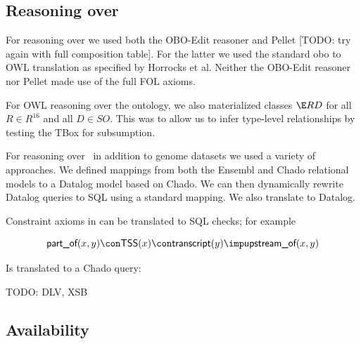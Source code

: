 \documentclass{article}
\def\upstreamOf{\pr{upstream\_of}}
\def\partOf{\pr{part\_of}}
\def\SOGI{\pr{SO$^{+}$}}
\def\transcript{\pr{transcript}}
\def\TSS{\pr{TSS}}
\begin{document}
\subsection{Reasoning over \SOGI}

For reasoning over \SOGI we used both the OBO-Edit reasoner and Pellet
[TODO: try again with full composition table]. For the latter we used
the standard obo to OWL translation as specified by Horrocks et
al. Neither the OBO-Edit reasoner nor Pellet made use of the full FOL
axioms.

For OWL reasoning over the ontology, we also materialized classes $\E
R D$ for all $R \in R^{16}$ and all $D \in SO$. This was to allow us
to infer type-level relationships by testing the TBox for subsumption.

For reasoning over \SOGI\ in addition to genome datasets we used a
variety of approaches. We defined mappings from both the Ensembl and
Chado relational models to a Datalog model based on Chado. We can then
dynamically rewrite Datalog queries to SQL using a standard
mapping\cite{Draxler1991}. We also translate \SOGI to Datalog.

Constraint axioms in \SOGI can be translated to SQL checks; for example

$$
\partOf(x,y) \con \TSS(x) \con \transcript(y) \imp \upstreamOf(x,y)
$$

Is translated to a Chado query:

\renewcommand{\ttdefault}{txtt}
\begin{scriptsize}
\lstset{linewidth=\textwidth}
\lstset{frame=trBL,frameround=tttt}



\end{scriptsize}

TODO: DLV, XSB



\subsection{Availability}
\end{document}

